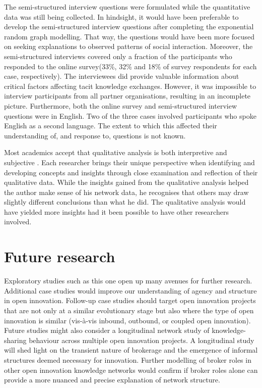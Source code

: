 The semi-structured interview questions were formulated while the quantitative data was still being collected. In hindsight, it would have been preferable to develop the semi-structured interview questions after completing the exponential random graph modelling. That way, the questions would have been more focused on seeking explanations to observed patterns of social interaction. Moreover, the semi-structured interviews covered only a fraction of the participants who responded to the online survey(33\%, 32\% and 18\% of survey respondents for each case, respectively). The interviewees did provide valuable information about critical factors affecting tacit knowledge exchanges. However, it was impossible to interview participants from all partner organisations, resulting in an incomplete picture. Furthermore, both the online survey and semi-structured interview questions were in English. Two of the three cases involved participants who spoke English as a second language. The extent to which this affected their understanding of, and response to, questions is not known. \medskip

Most academics accept that qualitative analysis is both interpretive and subjective \citep{aspers2019qualitative}. Each researcher brings their unique perspective when identifying and developing concepts and insights through close examination and reflection of their qualitative data. While the insights gained from the qualitative analysis helped the author make sense of his network data, he recognises that others may draw slightly different conclusions than what he did. The qualitative analysis would have yielded more insights had it been possible to have other researchers involved.

\section{Future research}

Exploratory studies such as this one open up many avenues for further research. Additional case studies would improve our understanding of agency and structure in open innovation. Follow-up case studies should target open innovation projects that are not only at a similar evolutionary stage but also where the type of open innovation is similar (vis-\`a-vis inbound, outbound, or coupled open innovation). Future studies might also consider a longitudinal network study of knowledge-sharing behaviour across multiple open innovation projects. A longitudinal study will shed light on the transient nature of brokerage and the emergence of informal structures deemed necessary for innovation. Further modelling of broker roles in other open innovation knowledge networks would confirm if broker roles alone can provide a more nuanced and precise explanation of network structure. \medskip

